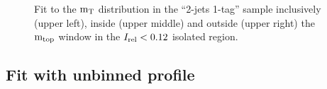 {\begin{figure}[h!]
\caption{Fit to the ${\rm m_{T}}$ distribution in the \textquotedblleft{}2-jets
1-tag\textquotedblright{} sample inclusively (upper left), inside
(upper middle) and outside (upper right) the ${\rm m_{top}}$ window in
the $I_{\mathrm{rel}} < 0.12$ isolated region.}
\end{figure}

\clearpage



\subsection{Fit with unbinned profile}

\begin{figure}[h!]
\centering{}


\end{figure}}
